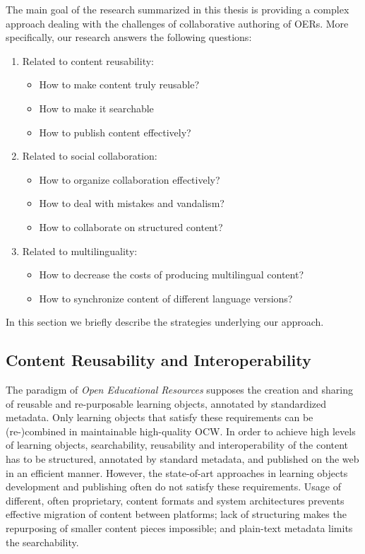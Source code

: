 \documentclass[ngerman,UKenglish,table]{scrbook}
\begin{document}
The main goal of the research summarized in this thesis is providing a complex approach dealing with the challenges of collaborative authoring of OERs.
More specifically, our research answers the following questions:
\begin{enumerate}
\item Related to content reusability: 
\begin{itemize}
\item How to make content truly reusable?
\item How to make it searchable
\item How to publish content effectively?
\end{itemize} 
\item Related to social collaboration: 
\begin{itemize}
\item How to organize collaboration effectively?
\item How to deal with mistakes and vandalism?
\item How to collaborate on structured content?
\end{itemize}
\item Related to multilinguality: 
\begin{itemize}
\item How to decrease the costs of producing multilingual content?
\item How to synchronize content of different language versions?
\end{itemize}
\end{enumerate}
In this section we briefly describe the strategies underlying our approach.

\subsection{Content Reusability and Interoperability}
\label{sec:content_reusability_structuring}
The paradigm of \emph{Open Educational Resources} supposes the creation and sharing of reusable and re-purposable learning objects, annotated by standardized metadata.
Only learning objects that satisfy these requirements can be (re-)combined in maintainable high-quality OCW.
In order to achieve high levels of learning objects, searchability, reusability and interoperability of the content has to be structured, annotated by standard metadata, and  published on the web in an efficient manner.
However, the state-of-art approaches in learning objects development and publishing often do not satisfy these requirements.
Usage of different, often proprietary, content formats and system architectures prevents effective migration of content between platforms; lack of structuring makes the repurposing of smaller content pieces impossible; and plain-text metadata limits the searchability.
\end{document}
